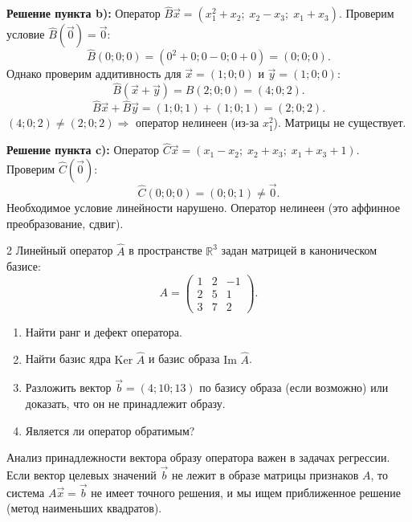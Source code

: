 \documentclass[12pt,a4paper]{article}
\theoremstyle{plain}
\theoremstyle{definition}
\begin{document}
\begin{solbox}
    \vspace{0.2cm}
    \textbf{Решение пункта b):}
    Оператор $\hat{B}\vec{x} = (x_1^2 + x_2; \; x_2 - x_3; \; x_1 + x_3)$.
    Проверим условие $\hat{B}(\vec{0}) = \vec{0}$:
    \[
    \hat{B}(0;0;0) = (0^2+0; 0-0; 0+0) = (0;0;0).
    \]
    Однако проверим аддитивность для $\vec{x}=(1;0;0)$ и $\vec{y}=(1;0;0)$:
    \[
    \hat{B}(\vec{x}+\vec{y}) = \hat{B}(2;0;0) = (4; 0; 2).
    \]
    \[
    \hat{B}\vec{x} + \hat{B}\vec{y} = (1;0;1) + (1;0;1) = (2;0;2).
    \]
    $(4;0;2) \neq (2;0;2) \Rightarrow$ оператор нелинеен (из-за $x_1^2$). Матрицы не существует.

    \vspace{0.2cm}
    \textbf{Решение пункта c):}
    Оператор $\hat{C}\vec{x} = (x_1 - x_2; \; x_2 + x_3; \; x_1 + x_3 + 1)$.
    Проверим $\hat{C}(\vec{0})$:
    \[
    \hat{C}(0;0;0) = (0; 0; 1) \neq \vec{0}.
    \]
    Необходимое условие линейности нарушено. Оператор нелинеен (это аффинное преобразование, сдвиг).
\end{solbox}

\begin{taskbox}{2}
    Линейный оператор $\hat{A}$ в пространстве $\mathbb{R}^3$ задан матрицей в каноническом базисе:
    \[
    A = \begin{pmatrix} 1 & 2 & -1 \\ 2 & 5 & 1 \\ 3 & 7 & 2 \end{pmatrix}.
    \]
    \begin{enumerate}
        \item Найти ранг и дефект оператора.
        \item Найти базис ядра $\text{Ker } \hat{A}$ и базис образа $\text{Im } \hat{A}$.
        \item Разложить вектор $\vec{b} = (4; 10; 13)$ по базису образа (если возможно) или доказать, что он не принадлежит образу.
        \item Является ли оператор обратимым?
    \end{enumerate}
\end{taskbox}

\begin{itbox}
    Анализ принадлежности вектора образу оператора важен в задачах регрессии. Если вектор целевых значений $\vec{b}$ не лежит в образе матрицы признаков $A$, то система $A\vec{x}=\vec{b}$ не имеет точного решения, и мы ищем приближенное решение (метод наименьших квадратов).
\end{itbox}
\end{document}
